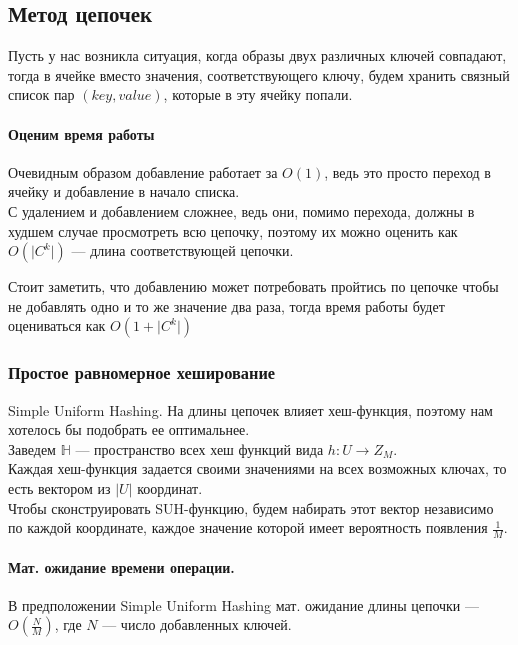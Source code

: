 \subsection{Метод цепочек}
Пусть у нас возникла ситуация, когда образы двух различных ключей совпадают, тогда в ячейке вместо значения, 
соответствующего ключу, будем хранить связный список пар $(key, value)$, которые в эту ячейку попали.

\paragraph{Оценим время работы}%
\label{par:Оценим время работы}
Очевидным образом добавление работает за $O(1)$, ведь это просто переход в ячейку и добавление в начало списка. \\
С удалением и добавлением сложнее, ведь они, помимо перехода, должны в худшем случае просмотреть всю цепочку, 
поэтому их можно оценить как $O(\lvert C^k \rvert)$ --- длина соответствующей цепочки.

\begin{note}
    Стоит заметить, что добавлению может потребовать пройтись по цепочке чтобы не добавлять одно и то же значение два раза,
    тогда время работы будет оцениваться как $O(1 + \lvert C^k \rvert)$
\end{note}

\subsubsection{Простое равномерное хеширование}
Simple Uniform Hashing.
На длины цепочек влияет хеш-функция, поэтому нам хотелось бы подобрать ее оптимальнее. \\
Заведем $\mathbb{H}$ --- пространство всех хеш функций вида $h: U \to Z_M$. \\ 

Каждая хеш-функция задается своими значениями на всех возможных ключах, 
то есть вектором из $\lvert U \rvert$ координат. \\

Чтобы сконструировать SUH-функцию, будем набирать этот вектор независимо по каждой координате,
каждое значение которой имеет вероятность появления $\frac{1}{M}$.

\paragraph{Мат. ожидание времени операции.}
\begin{theorem}
    В предположении Simple Uniform Hashing мат. ожидание длины цепочки --- $O(\frac{N}{M})$, где $N$ --- число добавленных ключей.
\end{theorem}


